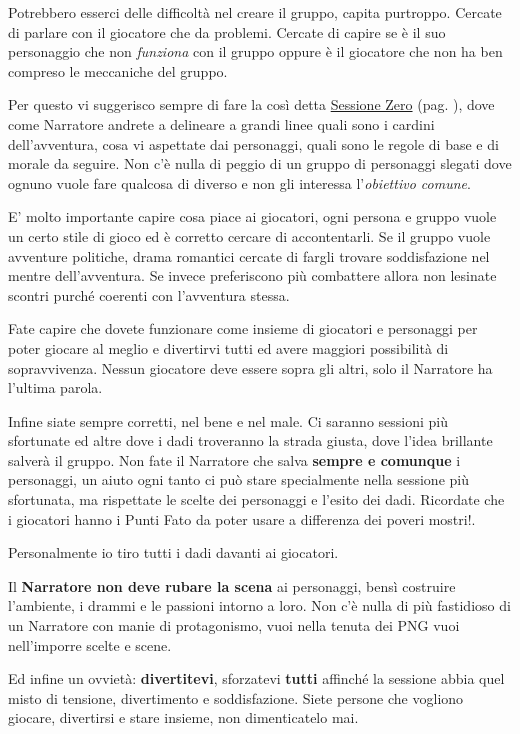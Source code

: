 {\begin{multicols}{2}
Potrebbero esserci delle difficoltà nel creare il gruppo, capita purtroppo. Cercate di parlare con il giocatore che da problemi. Cercate di capire se è il suo personaggio che non \emph{funziona} con il gruppo oppure è il giocatore che non ha ben compreso le meccaniche del gruppo.

Per questo vi suggerisco sempre di fare la così detta \hyperlink{sessionezero}{Sessione Zero} (pag. \pageref{sessionezero}), dove come Narratore andrete a delineare a grandi linee quali sono i cardini dell'avventura, cosa vi aspettate dai personaggi, quali sono le regole di base e di morale da seguire. Non c'è nulla di peggio di un gruppo di personaggi slegati dove ognuno vuole fare qualcosa di diverso e non gli interessa l'\emph{obiettivo comune}.

E' molto importante capire cosa piace ai giocatori, ogni persona e gruppo vuole un certo stile di gioco ed è corretto cercare di accontentarli. Se il gruppo vuole avventure politiche, drama romantici cercate di fargli trovare soddisfazione nel mentre dell'avventura. Se invece preferiscono più combattere allora non lesinate scontri purché coerenti con l'avventura stessa.

Fate capire che dovete funzionare come insieme di giocatori e personaggi per poter giocare al meglio e divertirvi tutti ed avere maggiori possibilità di sopravvivenza. Nessun giocatore deve essere sopra gli altri, solo il Narratore ha l'ultima parola.

Infine siate sempre corretti, nel bene e nel male. Ci saranno sessioni più sfortunate ed altre dove i dadi troveranno la strada giusta, dove l'idea brillante salverà il gruppo. Non fate il Narratore che salva \textbf{sempre e comunque} i personaggi, un aiuto ogni tanto ci può stare specialmente nella sessione più sfortunata, ma rispettate le scelte dei personaggi e l'esito dei dadi. Ricordate che i giocatori hanno i Punti Fato da poter usare a differenza dei poveri mostri!.

Personalmente io tiro tutti i dadi davanti ai giocatori.

Il \textbf{Narratore non deve rubare la scena} ai personaggi, bensì costruire l'ambiente, i drammi e le passioni intorno a loro. Non c'è nulla di più fastidioso di un Narratore con manie di protagonismo, vuoi nella tenuta dei PNG vuoi nell'imporre scelte e scene.

Ed infine un ovvietà: \textbf{divertitevi}, sforzatevi \textbf{tutti} affinché la sessione abbia quel misto di tensione, divertimento e soddisfazione. Siete persone che vogliono giocare, divertirsi e stare insieme, non dimenticatelo mai.
\end{multicols}}

